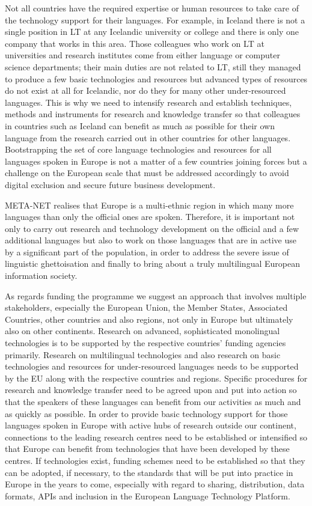 \documentclass[10pt, plain]{../../metanetpaper}
\begin{document}
\begin{multicols}{2}
Not all countries have the required expertise or human resources to take care of the technology support for their languages. For example, in Iceland there is not a single position in LT at any Icelandic university or college and there is only one company that works in this area. Those colleagues who work on LT at universities and research institutes come from either language or computer science departments; their main duties are not related to LT, still they managed to produce a few basic technologies and resources but advanced types of resources do not exist at all for Icelandic, nor do they for many other under-resourced languages. This is why we need to intensify research and establish techniques, methods and instruments for research and knowledge transfer so that colleagues in countries such as Iceland can benefit as much as possible for their own language from the research carried out in other countries for other languages. Bootstrapping the set of core language technologies and resources for all languages spoken in Europe is not a matter of a few countries joining forces but a challenge on the European scale that must be addressed accordingly to avoid digital exclusion and secure future business development.

META-NET realises that Europe is a multi-ethnic region in which many more languages than only the official ones are spoken. Therefore, it is important not only to carry out research and technology development on the official and a few additional languages but also to work on those languages that are in active use by a significant part of the population, in order to address the severe issue of linguistic ghettoisation and finally to bring about a truly multilingual European information society.

As regards funding the programme we suggest an approach that involves multiple stakeholders, especially the European Union, the Member States, Associated Countries, other countries and also regions, not only in Europe but ultimately also on other continents. Research on advanced, sophisticated monolingual technologies is to be supported by the respective countries' funding agencies primarily. Research on multilingual technologies and also research on basic technologies and resources for under-resourced languages needs to be supported by the EU along with the respective countries and regions. Specific procedures for research and knowledge transfer need to be agreed upon and put into action so that the speakers of these languages can benefit from our activities as much and as quickly as possible. In order to provide basic technology support for those languages spoken in Europe with active hubs of research outside our continent, connections to the leading research centres need to be established or intensified so that Europe can benefit from technologies that have been developed by these centres. If technologies exist, funding schemes need to be established so that they can be adopted, if necessary, to the standards that will be put into practice in Europe in the years to come, especially with regard to sharing, distribution, data formats, APIs and inclusion in the European Language Technology Platform.


\end{multicols}
\end{document}
